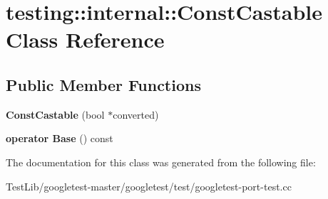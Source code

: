 \hypertarget{classtesting_1_1internal_1_1ConstCastable}{}\section{testing\+:\+:internal\+:\+:Const\+Castable Class Reference}
\label{classtesting_1_1internal_1_1ConstCastable}
\subsection*{Public Member Functions}
\begin{DoxyCompactItemize}
\item 
\mbox{\label{classtesting_1_1internal_1_1ConstCastable_a78eba470cc71528237a33a10a92fba7e}} 
{\bfseries Const\+Castable} (bool $\ast$converted)
\item 
\mbox{\label{classtesting_1_1internal_1_1ConstCastable_af084893d6786010022297b1e88f4743b}} 
{\bfseries operator Base} () const
\end{DoxyCompactItemize}


The documentation for this class was generated from the following file\+:\begin{DoxyCompactItemize}
\item 
Test\+Lib/googletest-\/master/googletest/test/googletest-\/port-\/test.\+cc\end{DoxyCompactItemize}
